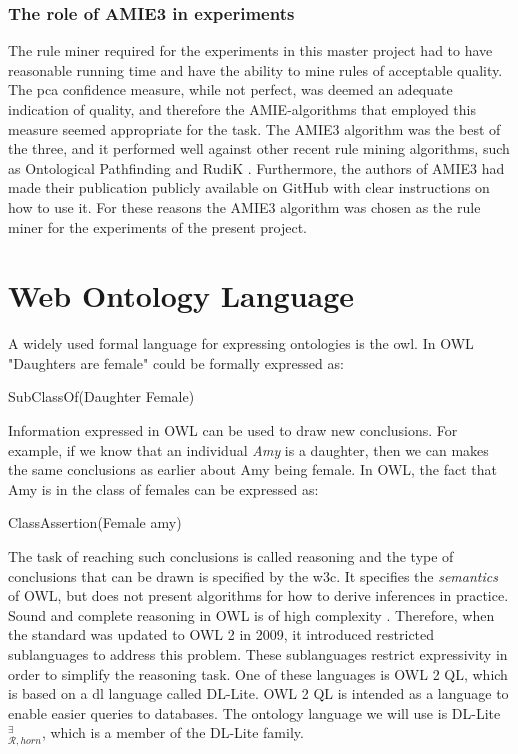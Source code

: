 \subsubsection{The role of AMIE3 in experiments}
The rule miner required for the experiments in this master project had to have reasonable running time and have the ability to mine rules of acceptable quality. The \gls{pca} confidence measure, while not perfect, was deemed an adequate indication of quality, and therefore the AMIE-algorithms that employed this measure seemed appropriate for the task. The AMIE3 algorithm was the best of the three, and it performed well against other recent rule mining algorithms, such as Ontological Pathfinding \cite{op} and RudiK \cite{rudik}. Furthermore, the authors of AMIE3 had made their publication publicly available on GitHub with clear instructions on how to use it. For these reasons the AMIE3 algorithm was chosen as the rule miner for the experiments of the present project.








\iffalse 
\section{Web Ontology Language}
A widely used formal language for expressing ontologies is the \gls{owl}. In OWL "Daughters are female" could be formally expressed as:

\centerline{\textsf{SubClassOf(Daughter Female)}}
Information expressed in OWL can be used to draw new conclusions. For example, if we know that an individual \emph{Amy} is a daughter, then we can makes the same conclusions as earlier about Amy being female. In OWL, the fact that Amy is in the class of females can be expressed as:

\centerline{\textsf{ClassAssertion(Female amy)}}
The task of reaching such conclusions is called reasoning and the type of conclusions that can be drawn is specified by the \gls{w3c}. It specifies the \emph{semantics} of OWL, but does not present algorithms for how to derive inferences in practice. Sound and complete reasoning in OWL is of high complexity \cite{Krotzsch2012}. Therefore, when the standard was updated to OWL 2 in 2009, it introduced restricted sublanguages to address this problem. These sublanguages restrict expressivity in order to simplify the reasoning task. One of these languages is OWL 2 QL, which is based on a \gls{dl} language called DL-Lite. OWL 2 QL is intended as a language to enable easier queries to databases. The ontology language we will use is DL-Lite$_{\mathcal{R}, horn}^{\exists}$, which is a member of the DL-Lite family.



